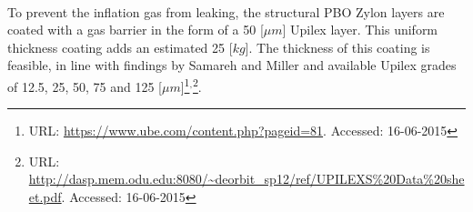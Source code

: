 To prevent the inflation gas from leaking, the structural PBO Zylon\textsuperscript{\textregistered} layers are coated with a gas barrier in the form of a 50 [$\mu m$] Upilex layer. This uniform thickness coating adds an estimated 25 [$kg$]. The thickness of this coating is feasible, in line with findings by Samareh and Miller \cite{Samareh2011,Miller2014} and available Upilex grades of 12.5, 25, 50, 75 and 125 [$\mu m$]\footnote{URL: \url{https://www.ube.com/content.php?pageid=81}. Accessed: 16-06-2015}$^{,}$\footnote{URL: \url{http://dasp.mem.odu.edu:8080/~deorbit_sp12/ref/UPILEXS\%20Data\%20sheet.pdf}. Accessed: 16-06-2015}.



